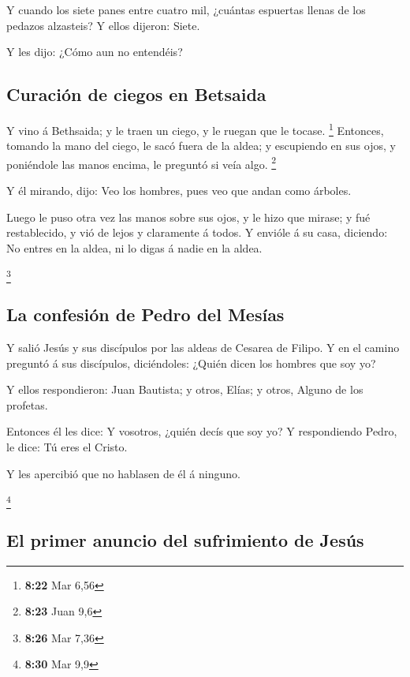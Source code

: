  Y cuando los siete panes entre cuatro mil, ¿cuántas
espuertas llenas de los pedazos alzasteis? Y ellos dijeron: Siete.

 Y les dijo: ¿Cómo aun no entendéis?

\hypertarget{curaciuxf3n-de-ciegos-en-betsaida}{%
\subsection{Curación de ciegos en
Betsaida}\label{curaciuxf3n-de-ciegos-en-betsaida}}

 Y vino á Bethsaida; y le traen un ciego, y le ruegan que
le tocase. \footnote{\textbf{8:22} Mar 6,56}  Entonces,
tomando la mano del ciego, le sacó fuera de la aldea; y escupiendo en
sus ojos, y poniéndole las manos encima, le preguntó si veía algo.
\footnote{\textbf{8:23} Juan 9,6}

 Y él mirando, dijo: Veo los hombres, pues veo que andan
como árboles.

 Luego le puso otra vez las manos sobre sus ojos, y le
hizo que mirase; y fué restablecido, y vió de lejos y claramente á
todos.  Y envióle á su casa, diciendo: No entres en la
aldea, ni lo digas á nadie en la aldea.

\footnote{\textbf{8:26} Mar 7,36}

\hypertarget{la-confesiuxf3n-de-pedro-del-mesuxedas}{%
\subsection{La confesión de Pedro del
Mesías}\label{la-confesiuxf3n-de-pedro-del-mesuxedas}}

 Y salió Jesús y sus discípulos por las aldeas de Cesarea
de Filipo. Y en el camino preguntó á sus discípulos, diciéndoles: ¿Quién
dicen los hombres que soy yo?

 Y ellos respondieron: Juan Bautista; y otros, Elías; y
otros, Alguno de los profetas.

 Entonces él les dice: Y vosotros, ¿quién decís que soy
yo? Y respondiendo Pedro, le dice: Tú eres el Cristo.

 Y les apercibió que no hablasen de él á ninguno.

\footnote{\textbf{8:30} Mar 9,9}

\hypertarget{el-primer-anuncio-del-sufrimiento-de-jesuxfas}{%
\subsection{El primer anuncio del sufrimiento de
Jesús}\label{el-primer-anuncio-del-sufrimiento-de-jesuxfas}}

